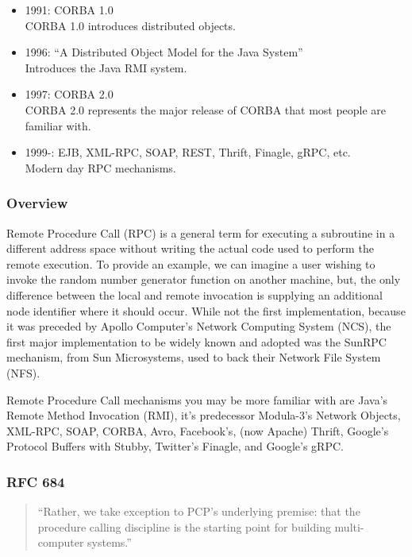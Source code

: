 \begin{itemize}
\item{1991:} CORBA 1.0 \\
	CORBA 1.0 introduces distributed objects.

\item{1996:} ``A Distributed Object Model for the Java System''~\cite{wollrath1996distributed} \\
	Introduces the Java RMI system.

\item{1997:} CORBA 2.0 \\
	CORBA 2.0 represents the major release of CORBA that most people are familiar with.

\item{1999-:} EJB, XML-RPC, SOAP, REST, Thrift, Finagle, gRPC, etc. \\
	Modern day RPC mechanisms.

\end{itemize}

\subsubsection{Overview}

Remote Procedure Call (RPC) is a general term for executing a subroutine in a different address space without writing the actual code used to perform the remote execution.	To provide an example, we can imagine a user wishing to invoke the random number generator function on another machine, but, the only difference between the local and remote invocation is supplying an additional node identifier where it should occur.  While not the first implementation, because it was preceded by Apollo Computer's Network Computing System (NCS), the first major implementation to be widely known and adopted was the SunRPC mechanism, from Sun Microsystems, used to back their Network File System (NFS).

Remote Procedure Call mechanisms you may be more familiar with are Java's Remote Method Invocation (RMI), it's predecessor Modula-3's Network Objects, XML-RPC, SOAP, CORBA, Avro, Facebook's, (now Apache) Thrift, Google's Protocol Buffers with Stubby, Twitter's Finagle, and Google's gRPC.

\subsubsection{RFC 684}

\begin{quote}
``Rather, we take exception to PCP’s underlying premise: that the procedure calling discipline is the starting point for building multi-computer systems.''	
\end{quote}

